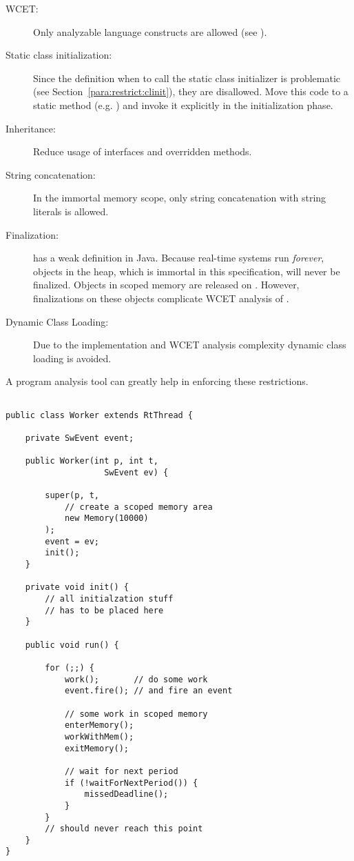 \begin{description}
    \item[WCET:] Only analyzable language constructs are allowed
        (see \cite{pusch:maxt:jnl}).

    \item[Static class initialization:] Since the definition when
        to call the static class initializer is problematic (see
        Section~\ref{para:restrict:clinit}), they are disallowed.
        Move this code to a static method (e.g. )
        and invoke it explicitly in the initialization phase.

    \item[Inheritance:] Reduce usage of interfaces and overridden methods.

    \item[String concatenation:] In the immortal memory scope,
        only string concatenation with string literals is
        allowed.

    \item[Finalization:]  has a weak definition
in Java. Because real-time systems run \emph{forever}, objects in
the heap, which is immortal in this specification, will never be
finalized. Objects in scoped memory are released on
. However, finalizations on these objects
complicate WCET analysis of .

    \item[Dynamic Class Loading:] Due to the implementation and WCET analysis
complexity dynamic class loading is avoided.

\end{description}
%
A program analysis tool can greatly help in enforcing these
restrictions.


\begin{lstlisting}[float,caption={A periodic real-time thread},
label=lst:arch:rt:profile:example]

public class Worker extends RtThread {

    private SwEvent event;

    public Worker(int p, int t,
                    SwEvent ev) {

        super(p, t,
            // create a scoped memory area
            new Memory(10000)
        );
        event = ev;
        init();
    }

    private void init() {
        // all initialzation stuff
        // has to be placed here
    }

    public void run() {

        for (;;) {
            work();       // do some work
            event.fire(); // and fire an event

            // some work in scoped memory
            enterMemory();
            workWithMem();
            exitMemory();

            // wait for next period
            if (!waitForNextPeriod()) {
                missedDeadline();
            }
        }
        // should never reach this point
    }
}
\end{lstlisting}

